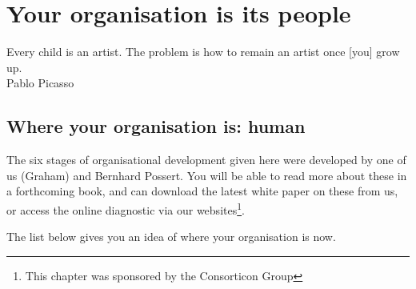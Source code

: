 ﻿%
\chapter{Your organisation is its people}
\label{chapter:who-is-your-organisation-human}


\begin{chapterquotation}
Every child is an artist. The problem is how to remain an artist once [you] grow up.\\
\raggedleft\textemdash Pablo Picasso 
\end{chapterquotation}




\section{Where your organisation is: human}
\label{section:where-is-your-organisation-human}


The six stages of organisational development given here were developed by one of us (Graham) and Bernhard Possert.  You will be able to read more about these in a forthcoming book, and can download the latest white paper on these from us, or access the online diagnostic via our websites\footnote{This chapter was sponsored by the Consorticon Group}.


The list below gives you an idea of where your organisation is now.


